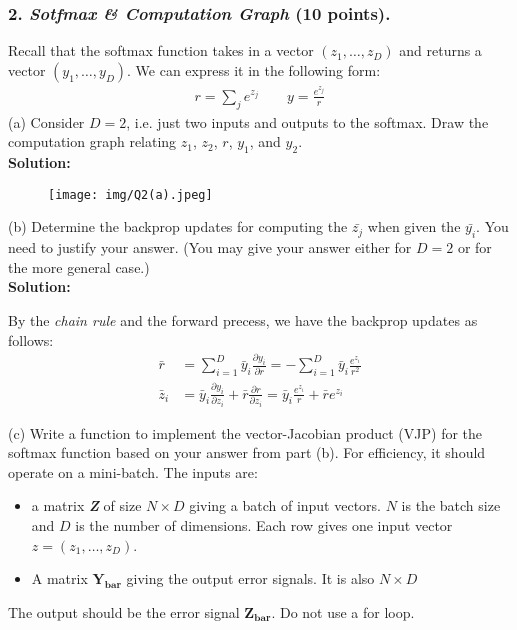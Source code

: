 \documentclass[12pt]{article}%
\newcommand{\PARTIAL}[2]{\frac{\partial #1}{\partial #2}}
\begin{document}
\pagebreak

\subsubsection*{2. \textit{Sotfmax \& Computation Graph} (10 points).}
Recall that the softmax function takes in a vector $(z_1, \dots , z_D)$ and returns a
vector $(y_1, \dots , y_D)$. We can express it in the following form:
\begin{equation*}
    \begin{split}
    r = \sum_j e^{z_j}   \qquad y = \frac{e^{z_j}}{r}
\end{split}
\end{equation*}
(a) Consider $D = 2$, i.e. just two inputs and outputs to the softmax. Draw the
computation graph relating $z_1$, $z_2$, $r$, $y_1$, and $y_2$.
\vspace{1em}\\
{\bf Solution:}
\begin{figure}[h]
    \begin{center}
        \texttt{[image: img/Q2(a).jpeg]}        
    \end{center}
\end{figure}


(b) Determine the backprop updates for computing the $\bar{z_j}$ when given the $\bar{y_i}$.
You need to justify your answer. (You may give your answer either for
$D = 2$ or for the more general case.)\\
{\bf Solution:}
\par By the {\it chain rule} and the forward precess, we have the backprop updates as follows:
\begin{align*}
    \bar{r} &= \sum_{i=1}^D \bar{y}_i \PARTIAL{y_i}{r} = -\sum_{i=1}^D\bar{y}_i\frac{e^{z_i}}{r^2}\\
    \bar{z}_i &= \bar{y}_i\PARTIAL{y_i}{z_i} + \bar{r}\PARTIAL{r}{z_i} = \bar{y}_i\frac{e^{z_i}}{r} + \bar{r}e^{z_i}
\end{align*}

(c) Write a function to implement the vector-Jacobian product (VJP) for the
softmax function based on your answer from part (b). For efficiency, it should
operate on a mini-batch.
The inputs are:
\begin{itemize}
    \item a matrix \textit{\textbf{Z}} of size $N \times D$ giving a batch of input vectors. $N$ is the batch
size and $D$ is the number of dimensions. Each row gives one input vector
$z = (z_1, \dots , z_D)$.
    \item A matrix $\mathbf{Y_{bar}}$ giving the output error signals. It is also $N \times D$
\end{itemize} 
\indent The output should be the error signal $\mathbf{Z_{bar}}$. Do not use a for loop.
\end{document}
